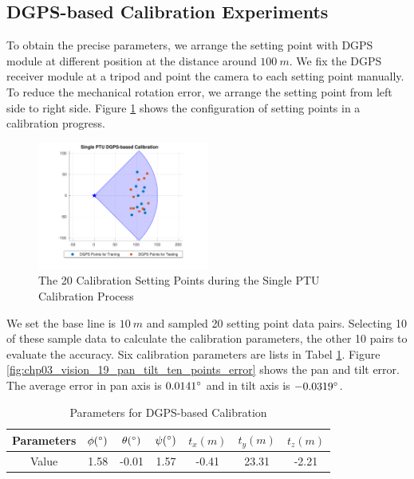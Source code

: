 \documentclass[journal,article,submit,moreauthors,pdftex,10pt,a4paper]{mdpi}
\begin{document}
\subsection{DGPS-based Calibration Experiments}
To obtain the precise parameters, we arrange the setting point with DGPS module at different position at the distance around $100\ m$. We fix the DGPS receiver module at a tripod and point the camera to each setting point manually. To reduce the mechanical rotation error, we arrange the setting point from left side to right side. Figure \ref{fig:chp03_vision_18_dgps_calibration_diagram} shows the configuration of setting points in a calibration progress.

\begin{figure}[!ht]
	\centering
	\includegraphics[width=0.5\textwidth]{Figs/chp03_vision_18_dgps_calibration_diagram.pdf}	
	\caption{The 20 Calibration Setting Points during the Single PTU Calibration Process}
	\label{fig:chp03_vision_18_dgps_calibration_diagram}
\end{figure}

We set the base line is $10\ m$ and sampled 20 setting point data pairs. Selecting 10 of these sample data to calculate the calibration parameters, the other 10 pairs to evaluate the accuracy. Six calibration parameters are lists in Tabel \ref{label:dgps_calibration}. Figure \ref{fig:chp03_vision_19_pan_tilt_ten_points_error} shows the pan and tilt error. The average error in pan axis is $0.0141 \degree$ and in tilt axis is $-0.0319\degree$.

\begin{table}[htb]
	\centering
	\caption{Parameters for DGPS-based Calibration}
	\label{label:dgps_calibration}
	\begin{tabular}{ccccccc}
		\hline
		Parameters & $\phi (\degree)$ & $\theta (\degree)$ & $\psi (\degree)$ & $t_x (m)$ & $t_y(m)$ & $t_z(m)$ \\ \hline
		Value & 1.58             & -0.01              & 1.57             & -0.41     & 23.31   & -2.21    \\ \hline
	\end{tabular}
\end{table}
\end{document}
